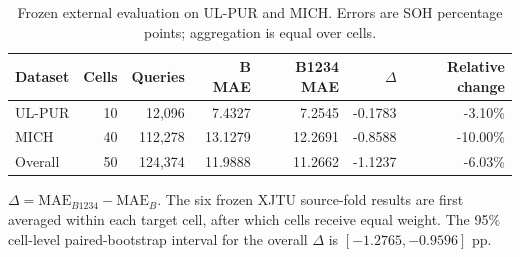 \begin{table}[!htbp]\centering
\caption{Frozen external evaluation on UL-PUR and MICH. Errors are SOH percentage points; aggregation is equal over cells.}\label{tab:external}
\papertablesize\setlength{\tabcolsep}{4pt}\renewcommand{\arraystretch}{1.15}
\begin{tabular}{lrrrrrr}\toprule
Dataset & Cells & Queries & B MAE & B1234 MAE & $\Delta$ & Relative change \\\midrule
UL-PUR & 10 & 12,096 & 7.4327 & 7.2545 & -0.1783 & -3.10\% \\
MICH & 40 & 112,278 & 13.1279 & 12.2691 & -0.8588 & -10.00\% \\
Overall & 50 & 124,374 & 11.9888 & 11.2662 & -1.1237 & -6.03\% \\\bottomrule
\end{tabular}
\par\smallskip\begin{minipage}{\columnwidth}\papertablesize $\Delta=\mathrm{MAE}_{B1234}-\mathrm{MAE}_{B}$. The six frozen XJTU source-fold results are first averaged within each target cell, after which cells receive equal weight. The 95\% cell-level paired-bootstrap interval for the overall $\Delta$ is $[-1.2765,-0.9596]$ pp.\end{minipage}
\end{table}
